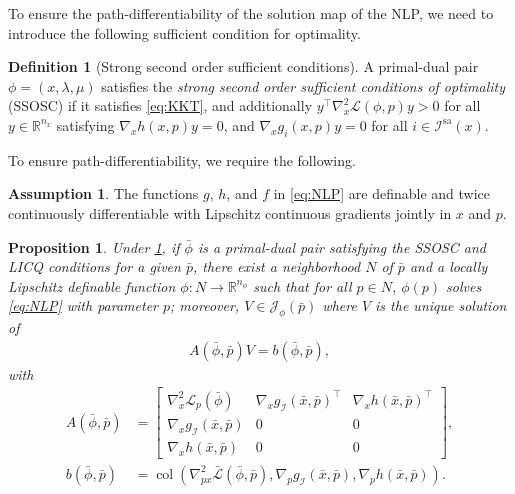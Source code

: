 \documentclass[journal,twoside,web,final]{ieeecolor}
\newtheorem{proposition}{Proposition}
\theoremstyle{definition}
\newtheorem{definition}{Definition}
\newtheorem{assumption}{Assumption}
\newcommand{\R}{\mathbb{R}}
\begin{document}
To ensure the path-differentiability of the solution map of the NLP, we need to introduce the following sufficient condition for optimality.
%
\begin{definition}[Strong second order sufficient conditions]
A primal-dual pair $\phi=(x,\lambda,\mu)$ satisfies the \emph{strong second order sufficient conditions of optimality} (SSOSC) if it satisfies \cref{eq:KKT}, and additionally $y^{\top} \nabla_x^2 \mathcal{L}(\phi,p) y >0$ for all $y\in \R^{n_x}$ satisfying $\nabla_x h(x,p)y=0$, and $\nabla_x g_{i}(x,p)y=0$ for all $i\in \mathcal{I}^\text{sa}(x)$.
\end{definition}
%
To ensure path-differentiability, we require the following.
%
\begin{assumption}\label{ass:path_diff}
The functions $g$, $h$, and $f$ in \cref{eq:NLP} are definable and twice continuously differentiable with Lipschitz continuous gradients jointly in $x$ and $p$. 
\end{assumption}
%
\begin{proposition}\label{prop:path_diff}
Under \cref{ass:path_diff}, if $\bar{\phi}$ is a primal-dual pair satisfying the SSOSC and LICQ conditions for a given $\bar{p}$, there exist a neighborhood $N$ of $\bar{p}$ and a locally Lipschitz definable function $\phi:N\to\R^{n_\phi}$ such that for all $p\in N$, $\phi(p)$ solves \cref{eq:NLP} with parameter $p$; moreover, $V\in \mathcal{J}_\phi(\bar{p})$ where $V$ is the unique solution of
\begin{align}
A(\bar{\phi},\bar{p})V=b(\bar{\phi},\bar{p}), \label{eq:derivative}
\end{align}
with
\begin{align*}
A(\bar{\phi},\bar{p})&=\begin{bmatrix}
\nabla_x^2 \mathcal{L}_p(\bar{\phi}) & \nabla_x g_{\mathcal{I}}(\bar{x},\bar{p})^{\top} & \nabla_x h(\bar{x},\bar{p})^{\top} \\
\nabla_x g_{\mathcal{I}}(\bar{x},\bar{p}) & 0 & 0 \\
\nabla_x h(\bar{x},\bar{p}) & 0 & 0
\end{bmatrix}, \\ %
b(\bar{\phi},\bar{p})&= \operatorname*{col}(%
\nabla^2_{px} \bar{\mathcal{L}}(\bar{\phi},\bar{p}),%
\nabla_p g_{\mathcal{I}}(\bar{x},\bar{p}),%
\nabla_p h(\bar{x},\bar{p})). %
\end{align*}
\end{proposition}
\end{document}
